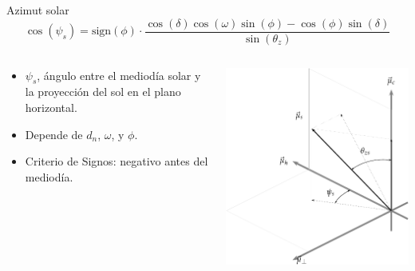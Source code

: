 \documentclass[xcolor={usenames,svgnames,dvipsnames}]{beamer}
\begin{document}
\begin{frame}[plain,label={sec:org3f771e3}]{Azimut solar}
\[
  \cos(\psi_{s}) = \mathrm{sign}(\phi) \cdot \frac{\cos(\delta) \cos(\omega) \sin(\phi) - \cos(\phi) \sin(\delta)} {\sin(\theta_{z})}
\]
\begin{columns}
\begin{column}{0.55\columnwidth}
\begin{itemize}
\item \(\psi_s\), ángulo entre el mediodía solar y la proyección del sol en el plano horizontal.
\item Depende de \(d_n\), \(\omega\), y \(\phi\).
\item Criterio de Signos: negativo antes del mediodía.
\end{itemize}
\end{column}

\begin{column}{0.7\columnwidth}
\begin{center}
\includegraphics[width=.9\linewidth]{../figs/SistemaCoordenadasLocal-crop.pdf}
\end{center}
\end{column}
\end{columns}
\end{frame}
\end{document}

